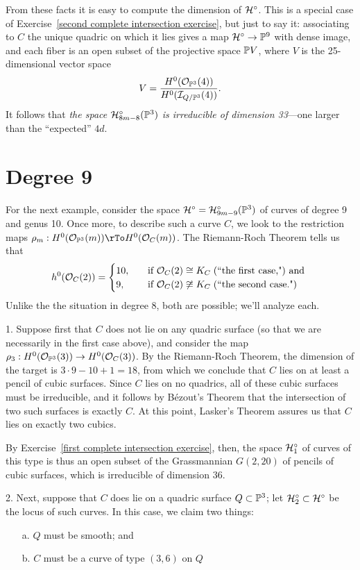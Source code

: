 From these facts it is easy to compute the dimension of  ${\cal H}^\circ$. This is a special case of Exercise~\ref{second complete intersection exercise}, but just to say it: associating to $C$ the unique quadric on which it lies gives a map ${\cal H}^\circ \to {\mathbb P}^9$ with dense image, and each fiber is an open subset of the projective space ${\mathbb P} V$, where $V$ is the 25-dimensional vector space
$$
V = \frac{H^0({\mathcal O}_{{\mathbb P}^3}(4))}{H^0({\mathcal I}_{Q/{\mathbb P}^3}(4))}.
$$
It follows that \emph{the space ${\cal H}^\circ_{8m-8}({\mathbb P}^3)$ is irreducible of dimension 33}---one larger than the ``expected'' $4d$.


\section{Degree 9}

For the next example, consider the space ${\cal H}^\circ = {\cal H}^\circ_{9m-9}({\mathbb P}^3)$ of curves of degree 9 and genus 10. Once more, to describe such a curve $C$, we look to the restriction maps $\rho_m: H^0(\cO_{\PP^3}(m)) \rTo H^0(\cO_C(m))$. The Riemann-Roch Theorem tells us that
\begin{align*}
h^0({\mathcal O}_C(2)) =
\begin{cases}
10, \quad &\text{if } {\mathcal O}_C(2) \cong K_C \; \text{(``the first case,") and } \\
9,  \quad &\text{if } {\mathcal O}_C(2) \not\cong K_C  \; \text{(``the second case.")}
\end{cases}
\end{align*}
Unlike the the situation in degree 8, both are possible; we'll analyze each.

1. Suppose first that $C$ does not lie on any quadric surface (so that we are necessarily in the first case above), and consider the map $\rho_3 : H^0({\mathcal O}_{{\mathbb P}^3}(3)) \to H^0({\mathcal O}_C(3))$. By the Riemann-Roch Theorem, the dimension of the target is $3\cdot 9 - 10 + 1 = 18$, from which we conclude that $C$ lies on at least a pencil of cubic surfaces. Since $C$ lies on no quadrics, all of these cubic surfaces must be irreducible, and it follows by B\'ezout's Theorem that the intersection of two such surfaces is exactly $C$. At this point, Lasker's Theorem assures us that $C$ lies on exactly two cubics.

By Exercise~\ref{first complete intersection exercise}, then, the space ${\cal H}^\circ_1$ of curves of this type is thus an open subset of the Grassmannian $G(2,20)$ of pencils of cubic surfaces, which is irreducible of dimension 36.

2. Next, suppose that $C$ does lie on a quadric surface $Q \subset {\mathbb P}^3$; let ${\cal H}^\circ_2 \subset {\cal H}^\circ$ be the locus of such curves. In this case, we claim two things:
\begin{enumerate}
\item[a.] $Q$ must be smooth; and
\item[b.] $C$ must be a curve of type $(3,6)$ on $Q$
\end{enumerate}

